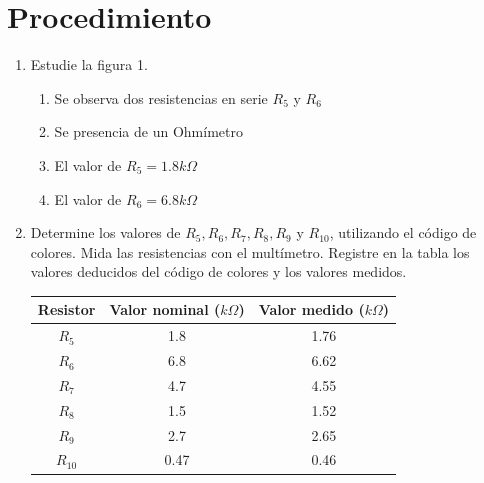 \section{Procedimiento}
\begin{enumerate}
	\item Estudie la figura 1.
	\begin{enumerate}
		\item Se observa dos resistencias en serie $R_{5}$ y $R_{6}$
		\item Se presencia de un Ohmímetro
		\item El valor de $ R_{5} = 1.8 k\Omega$
		\item	El valor de $R_{6} = 6.8 k\Omega$
	\end{enumerate}
	\item Determine los valores de $R_{5}, R_{6}, R_{7}, R_{8}, R_{9}$ y $R_{10}$, utilizando el código de colores. Mida las resistencias con el multímetro. Registre en la tabla los valores deducidos del código de colores y los valores medidos.
	\\
	\begin{table}[h]
		\centering
		\begin{tabular}{|c|c|c|}
			\hline
			\textbf{Resistor}&\textbf{Valor nominal ($k\Omega$)}& \textbf{Valor medido ($k\Omega$) } \\
				\hline
			$R_{5}$& 1.8&1.76 \\
			\hline
			$R_{6}$& 6.8&6.62 \\
			\hline
			$R_{7}$& 4.7&4.55 \\
			\hline
			$R_{8}$& 1.5&1.52\\
			\hline
			$R_{9}$&2.7&2.65 \\
			\hline
			$R_{10}$& 0.47&0.46 \\
			\hline
		\end{tabular}
		

\end{table}
\end{enumerate}
